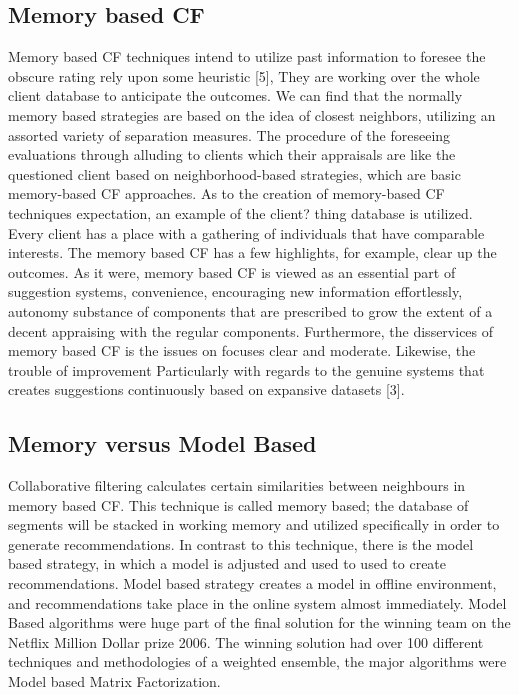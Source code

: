 \documentclass[10pt,conference]{IEEEtran}
\begin{document}
\subsection{Memory based CF}
Memory based CF techniques intend to utilize past information to foresee the obscure rating rely upon some heuristic [5], They are working over the whole client database to anticipate the outcomes. We can find that the normally memory based strategies are based on the idea of closest neighbors, utilizing an assorted variety of separation measures. The procedure of the foreseeing evaluations through alluding to clients which their appraisals are like the questioned client based on neighborhood-based strategies, which are basic memory-based CF approaches. As to the creation of memory-based CF techniques expectation, an example of the client? thing database is utilized. Every client has a place with a gathering of individuals that have comparable interests. The memory based CF has a few highlights, for example, clear up the outcomes. As it were, memory based CF is viewed as an essential part of suggestion systems, convenience, encouraging new information effortlessly, autonomy substance of components that are prescribed to grow the extent of a decent appraising with the regular components. Furthermore, the disservices of memory based CF is the issues on focuses clear and moderate. Likewise, the trouble of improvement Particularly with regards to the genuine systems that creates suggestions continuously based on expansive datasets [3]. 

\subsection{Memory versus Model Based}
Collaborative filtering calculates certain similarities between neighbours in memory based CF. This technique is called memory based; the database of segments will be stacked in working memory and utilized specifically in order to generate recommendations. In contrast to this technique, there is the model based strategy, in which a model is adjusted and used to used to create recommendations. Model based strategy creates a model in offline environment, and recommendations take place in the online system almost immediately. Model Based algorithms were huge part of the final solution for the winning team on the Netflix Million Dollar prize 2006. The winning solution had over 100 different techniques and methodologies of a weighted ensemble, the major algorithms were Model based Matrix Factorization.
\end{document}
